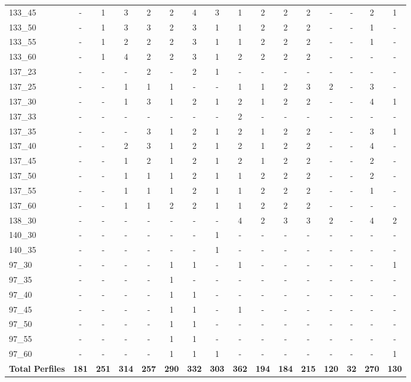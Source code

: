 {\begin{longtable}{lccccccccccccccc}
133\_45 & - & 1 & 3 & 2 & 2 & 4 & 3 & 1 & 2 & 2 & 2 & - & - & 2 & 1 \\
133\_50 & - & 1 & 3 & 3 & 2 & 3 & 1 & 1 & 2 & 2 & 2 & - & - & 1 & - \\
133\_55 & - & 1 & 2 & 2 & 2 & 3 & 1 & 1 & 2 & 2 & 2 & - & - & 1 & - \\
133\_60 & - & 1 & 4 & 2 & 2 & 3 & 1 & 2 & 2 & 2 & 2 & - & - & - & - \\
137\_23 & - & - & - & 2 & - & 2 & 1 & - & - & - & - & - & - & - & - \\
137\_25 & - & - & 1 & 1 & 1 & - & - & 1 & 1 & 2 & 3 & 2 & - & 3 & - \\
137\_30 & - & - & 1 & 3 & 1 & 2 & 1 & 2 & 1 & 2 & 2 & - & - & 4 & 1 \\
137\_33 & - & - & - & - & - & - & - & 2 & - & - & - & - & - & - & - \\
137\_35 & - & - & - & 3 & 1 & 2 & 1 & 2 & 1 & 2 & 2 & - & - & 3 & 1 \\
137\_40 & - & - & 2 & 3 & 1 & 2 & 1 & 2 & 1 & 2 & 2 & - & - & 4 & - \\
137\_45 & - & - & 1 & 2 & 1 & 2 & 1 & 2 & 1 & 2 & 2 & - & - & 2 & - \\
137\_50 & - & - & 1 & 1 & 1 & 2 & 1 & 1 & 2 & 2 & 2 & - & - & 2 & - \\
137\_55 & - & - & 1 & 1 & 1 & 2 & 1 & 1 & 2 & 2 & 2 & - & - & 1 & - \\
137\_60 & - & - & 1 & 1 & 2 & 2 & 1 & 1 & 2 & 2 & 2 & - & - & - & - \\
138\_30 & - & - & - & - & - & - & - & 4 & 2 & 3 & 3 & 2 & - & 4 & 2 \\
140\_30 & - & - & - & - & - & - & 1 & - & - & - & - & - & - & - & - \\
140\_35 & - & - & - & - & - & - & 1 & - & - & - & - & - & - & - & - \\
97\_30 & - & - & - & - & 1 & 1 & - & 1 & - & - & - & - & - & - & 1 \\
97\_35 & - & - & - & - & 1 & - & - & - & - & - & - & - & - & - & - \\
97\_40 & - & - & - & - & 1 & 1 & - & - & - & - & - & - & - & - & - \\
97\_45 & - & - & - & - & 1 & 1 & - & 1 & - & - & - & - & - & - & - \\
97\_50 & - & - & - & - & 1 & 1 & - & - & - & - & - & - & - & - & - \\
97\_55 & - & - & - & - & 1 & 1 & - & - & - & - & - & - & - & - & - \\
97\_60 & - & - & - & - & 1 & 1 & 1 & - & - & - & - & - & - & - & 1 \\
\midrule
\textbf{Total Perfiles} & \textbf{181} & \textbf{251} & \textbf{314} & \textbf{257} & \textbf{290} & \textbf{332} & \textbf{303} & \textbf{362} & \textbf{194} & \textbf{184} & \textbf{215} & \textbf{120} & \textbf{32} & \textbf{270} & \textbf{130} \\
\end{longtable}
}